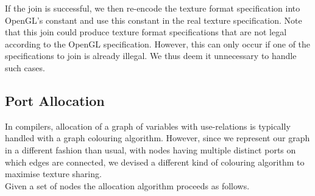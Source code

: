 \documentclass[format=sigconf]{acmart}
\begin{document}
If the join is successful, we then re-encode the texture format specification into OpenGL's constant and use this constant in the real texture specification. Note that this join could produce texture format specifications that are not legal according to the OpenGL specification. However, this can only occur if one of the specifications to join is already illegal. We thus deem it unnecessary to handle such cases.

\subsection{Port Allocation}\label{port-allocation}
In compilers, allocation of a graph of variables with use-relations is typically handled with a graph colouring algorithm. However, since we represent our graph in a different fashion than usual, with nodes having multiple distinct ports on which edges are connected, we devised a different kind of colouring algorithm to maximise texture sharing. \\

Given a set of nodes the allocation algorithm proceeds as follows.
\end{document}
